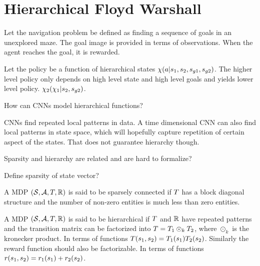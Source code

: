 \section{Hierarchical Floyd Warshall}

Let the navigation problem be defined as finding a sequence of goals in an unexplored maze.
The goal image is provided in terms of observations.
When the agent reaches the goal, it is rewarded.

Let the policy be a function of hierarchical states
$\chi(a | s_1, s_2, s_{g1}, s_{g2})$.
The higher level policy only depends on high level state and high level goals and yields lower level policy.
$\chi_2( \chi_1 | s_2, s_{g2} )$.

How can CNNs model hierarchical functions?



CNNs find repeated local patterns in data.
A time dimensional CNN can also find local patterns in state space,
which will hopefully capture repetition of certain aspect of the states.
That does not guarantee hierarchy though.

Sparsity and hierarchy are related and are hard to formalize?

Define sparsity of state vector?

\begin{definition}
  A MDP $(\mathcal{S}, \mathcal{A}, T, \mathbb{R})$ is said to be sparsely
  connected if $T$ has a block diagonal structure and the number
  of non-zero entities is much less than zero entities.
\end{definition}

\begin{definition}
  A MDP $(\mathcal{S}, \mathcal{A}, T, \mathbb{R})$ is said to be hierarchical if
  $T$ and $\mathbb{R}$ have repeated patterns and the transition matrix
  can be factorized into $T = T_1 \odot_k T_2$, where
  $\odot_k$ is the kronecker product.
  In terms of functions $T(s_1, s_2) = T_1(s_1)T_2(s_2)$.
  Similarly the reward function should also be factorizable.
  In terms of functions $r(s_1, s_2) = r_1(s_1) + r_2(s_2)$.
\end{definition}
